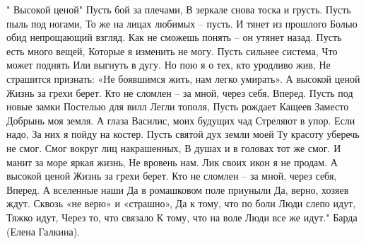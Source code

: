 \begin{itemize}
\begin{multicols}{3}
\obeycr
" Высокой ценой"
Пусть бой за плечами,
В зеркале снова тоска и грусть.
Пусть пыль под ногами,
То же на лицах любимых – пусть.
И тянет из прошлого
Болью обид непрощающий взгляд.
Как не сможешь понять – он утянет назад.
Пусть есть много вещей,
Которые я изменить не могу.
Пусть сильнее система,
Что может поднять
Или выгнуть в дугу.
Но пою я о тех, кто уродливо жив,
Не страшится признать:
«Не боявшимся жить,
нам легко умирать».
А высокой ценой
Жизнь за грехи берет.
Кто не сломлен – за мной, через себя,
Вперед.
Пусть под новые замки
Постелью для вилл
Легли тополя,
Пусть рождает Кащеев
Заместо Добрынь моя земля.
А глаза Василис, моих будущих чад
Стреляют в упор.
Если надо,
За них я пойду на костер.
Пусть святой дух земли моей
Ту красоту уберечь не смог.
Смог вокруг лиц накрашенных,
В душах и в головах тот же смог.
И манит за море яркая жизнь,
Не вровень нам.
Лик своих икон я не продам.
А высокой ценой
Жизнь за грехи берет.
Кто не сломлен – за мной, через себя,
Вперед.
А вселенные наши
Да в ромашковом поле приуныли
Да, верно, хозяев ждут.
Сквозь «не верю» и «страшно»,
Да к тому, что по боли
Люди слепо идут,
Тяжко идут,
Через то, что связало
К тому, что на воле
Люди все же идут."
Барда (Елена Галкина).
\restorecr
\end{multicols}

\end{itemize} %
